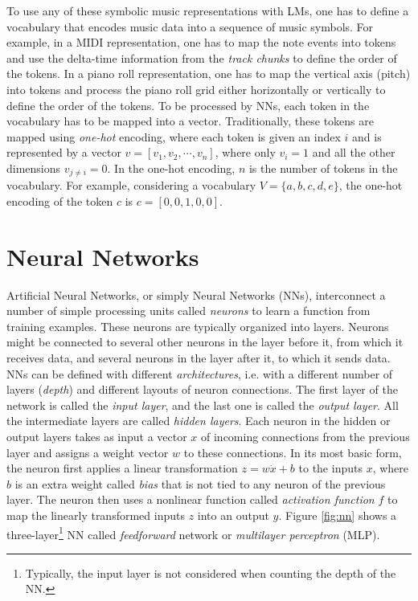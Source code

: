 To use any of these symbolic music representations with LMs, one has to define a vocabulary that encodes music data into a sequence of music symbols. %
For example, in a MIDI representation, one has to map the note events into tokens and use the delta-time information from the \textit{track chunks} to define the order of the tokens. In a piano roll representation, one has to map the vertical axis (pitch) into tokens and process the piano roll grid either horizontally or vertically to define the order of the tokens. To be processed by NNs, each token in the vocabulary has to be mapped into a vector. Traditionally, these tokens are mapped using \textit{one-hot} encoding, where each token is given an index $i$ and is represented by a vector $v = [v_1, v_2, \cdots, v_n]$, where only $v_i = 1$ and all the other dimensions $v_{j \neq i} = 0$. In the one-hot encoding, $n$ is the number of tokens in the vocabulary.
For example, considering a vocabulary $V = \{a, b, c, d, e\}$, the one-hot encoding of the token $c$ is $c = [0,0,1,0,0]$.

\section{Neural Networks}

Artificial Neural Networks, or simply Neural Networks (NNs), interconnect a number of simple processing units called \textit{neurons} to learn a function from training examples. These neurons are typically organized into layers. Neurons might be connected to several other neurons in the layer before it, from which it receives data, and several neurons in the layer after it, to which it sends data. NNs can be defined with different \textit{architectures}, i.e. with a different number of layers (\textit{depth}) and different layouts of neuron connections. The first layer of the network is called the \textit{input layer}, and the last one is called the \textit{output layer}. All the intermediate layers are called \textit{hidden layers}. Each neuron in the hidden or output layers takes as input a vector $x$ of incoming connections from the previous layer and assigns a weight vector $w$ to these connections. In its most basic form, the neuron first applies a linear transformation $z = w \dot x + b$ to the inputs $x$, where $b$ is an extra weight called \textit{bias} that is not tied to any neuron of the previous layer. The neuron then uses a nonlinear function called \textit{activation function} $f$ to map the linearly transformed inputs $z$ into an output $\hat{y}$.
Figure \ref{fig:nn} shows a three-layer\footnote{Typically, the input layer is not considered when counting the depth of the NN.} NN called \textit{feedforward} network or \textit{multilayer perceptron} (MLP).

